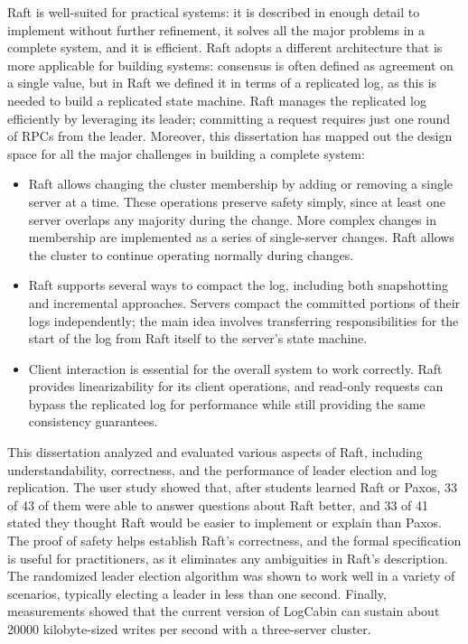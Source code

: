 Raft is well-suited for practical systems: it is described in enough
detail to implement without further refinement, it solves all the major
problems in a complete system, and it is efficient. Raft adopts a
different architecture that is more applicable for building systems:
consensus is often defined as agreement on a single value, but in Raft
we defined it in terms of a replicated log, as this is needed to build a
replicated state machine. Raft manages the replicated log efficiently by
leveraging its leader; committing a request requires just one round of
RPCs from the leader. Moreover, this dissertation has mapped out the
design space for all the major challenges in building a complete system:
%
\begin{itemize}
%
\item Raft allows changing the cluster membership by adding or removing
a single server at a time. These operations preserve safety simply,
since at least one server overlaps any majority during the change.
More complex changes in membership are implemented as a series of
single-server changes. Raft allows the cluster to continue operating
normally during changes.
%
\item Raft supports several ways to compact the log, including both
snapshotting and incremental approaches. Servers compact the committed
portions of their logs independently; the main idea involves
transferring responsibilities for the start of the log from Raft itself
to the server's state machine.
%
\item Client interaction is essential for the overall system to work
correctly. Raft provides linearizability for its client operations, and
read-only requests can bypass the replicated log for performance while
still providing the same consistency guarantees.
%
\end{itemize}

This dissertation analyzed and evaluated various aspects of Raft,
including understandability, correctness, and the performance of leader
election and log
replication. The user study showed that,
after students learned Raft or Paxos, 33 of 43 of them were able to
answer questions about Raft better, and 33 of 41 stated they thought
Raft would be easier to implement or explain than Paxos. The proof of
safety helps establish Raft's correctness, and the formal specification
is useful for practitioners, as it eliminates any ambiguities in Raft's
description. The randomized leader election algorithm was shown
to work well in a variety of scenarios, typically electing a leader
in less than one second. Finally, measurements showed that the current version of
LogCabin can sustain about \num{20000} kilobyte-sized writes per second
with a three-server cluster.

